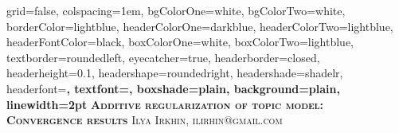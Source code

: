 \documentclass[portrait,final,a1paper,fontscale=0.401]{baposter}
\begin{document}
\begin{poster}%
  {
  grid=false,
  colspacing=1em,
  bgColorOne=white,
  bgColorTwo=white,
  borderColor=lightblue,
  headerColorOne=darkblue,
  headerColorTwo=lightblue,
  headerFontColor=black,
  boxColorOne=white,
  boxColorTwo=lightblue,
  textborder=roundedleft,
  eyecatcher=true,
  headerborder=closed,
  headerheight=0.1\textheight,
  headershape=roundedright,
  headershade=shadelr,
  headerfont=\Large\bf\textsc, %
  textfont={\setlength{\parindent}{0.5em}},
  boxshade=plain,
  background=plain,
  linewidth=2pt
  }
  {} 
  {\bf\textsc{Additive regularization of topic model: \\ Convergence results}\vspace{0.5em}}
  {\textsc{Ilya Irkhin, ilirhin@gmail.com }}
  {%
  }

    


\end{poster}
\end{document}
